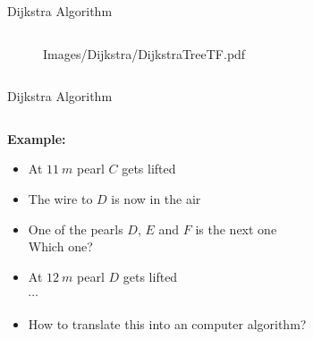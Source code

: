 \begin{frame}{Dijkstra Algorithm}
\begin{columns}
\begin{column}{0.45\linewidth}
\begin{figure}[!t]
          {Images/Dijkstra/DijkstraTreeTF.pdf}
      \end{figure}
    \end{column}
  \end{columns}
\end{frame}


\begin{frame}{Dijkstra Algorithm}
  \vspace{-1.5em}
  \begin{columns}
    \begin{column}{0.55\linewidth}
      \textbf{Example:}
      \begin{itemize}
        \item
          At $\SI{11}{m}$ pearl {\color{MainA}$C$} gets lifted
        \item
          The wire to {\color{MainA}$D$} is now in the air
        \item
          One of the pearls {\color{MainA}$D$}, {\color{MainA}$E$}
          and {\color{MainA}$F$} is the next one\\
          {\color{gray}Which one?}
        \item
          At $\SI{12}{m}$ pearl {\color{MainA}$D$} gets lifted\\
          $\cdots$
        \item
          {\color{gray}How to translate this into an computer algorithm?}
      \end{itemize}
    \end{column}
    \begin{column}{0.45\linewidth}
      \begin{figure}[!t]

\end{figure}
\end{column}
\end{columns}
\end{frame}
